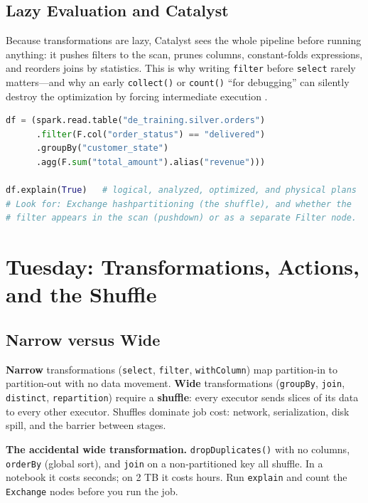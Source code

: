 \subsection{Lazy Evaluation and Catalyst}
Because transformations are lazy, Catalyst sees the whole pipeline before running anything: it pushes filters to the scan, prunes columns, constant-folds expressions, and reorders joins by statistics. This is why writing \texttt{filter} before \texttt{select} rarely matters---and why an early \texttt{collect()} or \texttt{count()} ``for debugging'' can silently destroy the optimization by forcing intermediate execution \cite{sparkDocs}.

\begin{lstlisting}[language=Python,caption={Reading the plan before running the job.},label={lst:ch4-explain}]
df = (spark.read.table("de_training.silver.orders")
      .filter(F.col("order_status") == "delivered")
      .groupBy("customer_state")
      .agg(F.sum("total_amount").alias("revenue")))

df.explain(True)   # logical, analyzed, optimized, and physical plans
# Look for: Exchange hashpartitioning (the shuffle), and whether the
# filter appears in the scan (pushdown) or as a separate Filter node.
\end{lstlisting}

\section{Tuesday: Transformations, Actions, and the Shuffle}
\subsection{Narrow versus Wide}
\textbf{Narrow} transformations (\texttt{select}, \texttt{filter}, \texttt{withColumn}) map partition-in to partition-out with no data movement. \textbf{Wide} transformations (\texttt{groupBy}, \texttt{join}, \texttt{distinct}, \texttt{repartition}) require a \textbf{shuffle}: every executor sends slices of its data to every other executor. Shuffles dominate job cost: network, serialization, disk spill, and the barrier between stages.

\begin{pitfall}
\textbf{The accidental wide transformation.} \texttt{dropDuplicates()} with no columns, \texttt{orderBy} (global sort), and \texttt{join} on a non-partitioned key all shuffle. In a notebook it costs seconds; on 2 TB it costs hours. Run \texttt{explain} and count the \texttt{Exchange} nodes before you run the job.
\end{pitfall}


